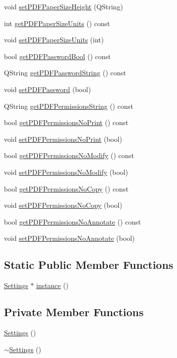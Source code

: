 \begin{CompactItemize}
void \hyperlink{classSettings_a43}{set\-PDFPaper\-Size\-Height} (QString)
\item 
int \hyperlink{classSettings_a44}{get\-PDFPaper\-Size\-Units} () const
\item 
void \hyperlink{classSettings_a45}{set\-PDFPaper\-Size\-Units} (int)
\item 
bool \hyperlink{classSettings_a46}{get\-PDFPassword\-Bool} () const
\item 
QString \hyperlink{classSettings_a47}{get\-PDFPassword\-String} () const
\item 
void \hyperlink{classSettings_a48}{set\-PDFPassword} (bool)
\item 
QString \hyperlink{classSettings_a49}{get\-PDFPermissions\-String} () const
\item 
bool \hyperlink{classSettings_a50}{get\-PDFPermissions\-No\-Print} () const
\item 
void \hyperlink{classSettings_a51}{set\-PDFPermissions\-No\-Print} (bool)
\item 
bool \hyperlink{classSettings_a52}{get\-PDFPermissions\-No\-Modify} () const
\item 
void \hyperlink{classSettings_a53}{set\-PDFPermissions\-No\-Modify} (bool)
\item 
bool \hyperlink{classSettings_a54}{get\-PDFPermissions\-No\-Copy} () const
\item 
void \hyperlink{classSettings_a55}{set\-PDFPermissions\-No\-Copy} (bool)
\item 
bool \hyperlink{classSettings_a56}{get\-PDFPermissions\-No\-Annotate} () const
\item 
void \hyperlink{classSettings_a57}{set\-PDFPermissions\-No\-Annotate} (bool)
\end{CompactItemize}
\subsection*{Static Public Member Functions}
\begin{CompactItemize}
\item 
\hyperlink{classSettings}{Settings} $\ast$ \hyperlink{classSettings_e0}{instance} ()
\end{CompactItemize}
\subsection*{Private Member Functions}
\begin{CompactItemize}
\item 
\hyperlink{classSettings_d0}{Settings} ()
\item 
\hyperlink{classSettings_d1}{$\sim$Settings} ()
\end{CompactItemize}
